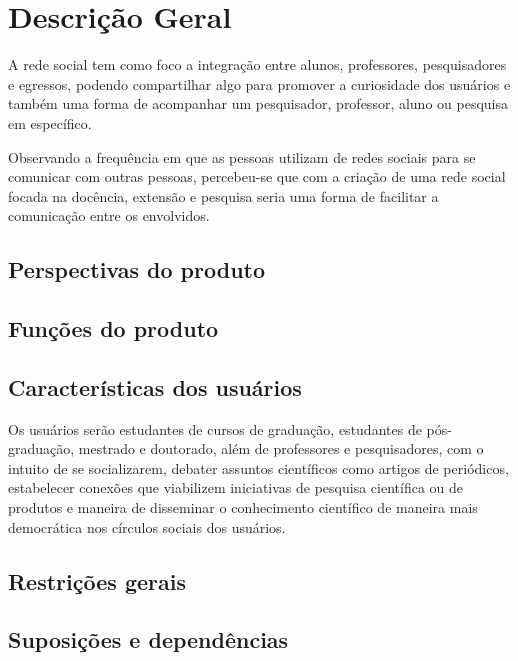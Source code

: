 \chapter{Descrição Geral}
A rede social tem como foco a integração entre alunos, professores, pesquisadores e egressos, 
podendo compartilhar algo para promover a curiosidade dos usuários e também uma forma de acompanhar um pesquisador, professor, aluno ou pesquisa em específico. 	

Observando a frequência em que as pessoas utilizam de redes sociais para se comunicar com outras pessoas, percebeu-se que com a criação de uma rede social focada na docência, extensão e pesquisa seria uma forma de facilitar a comunicação entre os envolvidos. 


\section{Perspectivas do produto}

\section{Funções do produto}

\section{Características dos usuários}
Os usuários serão estudantes de cursos de graduação, estudantes de pós-graduação, mestrado e doutorado, além de professores e pesquisadores, com o intuito de se socializarem, debater assuntos científicos como artigos de periódicos, estabelecer conexões que viabilizem iniciativas de pesquisa científica ou de produtos e maneira de disseminar o conhecimento científico de maneira mais democrática nos círculos sociais dos usuários.


\section{Restrições gerais}

\section{Suposições e dependências}
